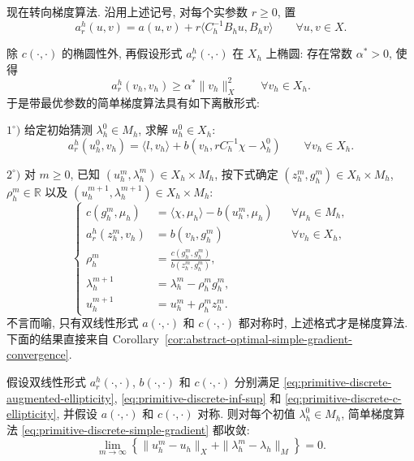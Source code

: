 现在转向梯度算法. 沿用上述记号, 对每个实参数 $r\geq0$, 置
\begin{equation}\label{eq:primitive-discrete-augmented-form}
a_r^h(u,v)=a(u,v)+r\langle C_h^{-1}B_hu,B_hv\rangle
\qquad\forall u,v\in X.
\end{equation}

除 $c(\cdot,\cdot)$ 的椭圆性外, 再假设形式 $a_r^h(\cdot,\cdot)$
在 $X_h$ 上椭圆: 存在常数 $\alpha^*>0$, 使得
\begin{equation}\label{eq:primitive-discrete-augmented-ellipticity}
a_r^h(v_h,v_h)\geq\alpha^*\|v_h\|_X^2
\qquad\forall v_h\in X_h.
\end{equation}
于是带最优参数的简单梯度算法具有如下离散形式:

$1^\circ)$ 给定初始猜测 $\lambda_h^0\in M_h$, 求解 $u_h^0\in X_h$:
\[
a_r^h(u_h^0,v_h)
=\langle l,v_h\rangle+b(v_h,rC_h^{-1}\chi-\lambda_h^0)
\qquad\forall v_h\in X_h.
\]

$2^\circ)$ 对 $m\geq0$, 已知
$(u_h^m,\lambda_h^m)\in X_h\times M_h$, 按下式确定
$(z_h^m,g_h^m)\in X_h\times M_h$, $\rho_h^m\in\mathbb R$ 以及
$(u_h^{m+1},\lambda_h^{m+1})\in X_h\times M_h$:
\begin{equation}\label{eq:primitive-discrete-simple-gradient}
\left\{
\begin{aligned}
c(g_h^m,\mu_h)&=\langle\chi,\mu_h\rangle-b(u_h^m,\mu_h)
&&\forall\mu_h\in M_h,\\
a_r^h(z_h^m,v_h)&=b(v_h,g_h^m)
&&\forall v_h\in X_h,\\
\rho_h^m&=\frac{c(g_h^m,g_h^m)}{b(z_h^m,g_h^m)},\\
\lambda_h^{m+1}&=\lambda_h^m-\rho_h^mg_h^m,\\
u_h^{m+1}&=u_h^m+\rho_h^mz_h^m.
\end{aligned}
\right.
\end{equation}
不言而喻, 只有双线性形式 $a(\cdot,\cdot)$ 和 $c(\cdot,\cdot)$
都对称时, 上述格式才是梯度算法. 下面的结果直接来自
Corollary~\ref{cor:abstract-optimal-simple-gradient-convergence}.

\setcounter{statement}{4}
\begin{Theorem}\label{thm:primitive-discrete-simple-gradient-convergence}
假设双线性形式 $a_r^h(\cdot,\cdot)$, $b(\cdot,\cdot)$ 和
$c(\cdot,\cdot)$ 分别满足
\eqref{eq:primitive-discrete-augmented-ellipticity},
\eqref{eq:primitive-discrete-inf-sup} 和
\eqref{eq:primitive-discrete-c-ellipticity}, 并假设
$a(\cdot,\cdot)$ 和 $c(\cdot,\cdot)$ 对称. 则对每个初值
$\lambda_h^0\in M_h$, 简单梯度算法
\eqref{eq:primitive-discrete-simple-gradient} 都收敛:
\[
\lim_{m\to\infty}\left\{
\|u_h^m-u_h\|_X+\|\lambda_h^m-\lambda_h\|_M
\right\}=0.
\]
\end{Theorem}

